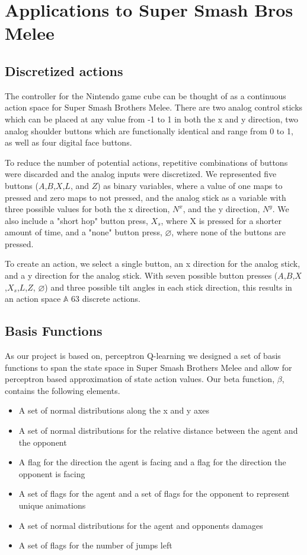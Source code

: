 \section{Applications to Super Smash Bros Melee}

\subsection{Discretized actions}
The controller for the Nintendo game cube can be thought of as a continuous action space for Super Smash Brothers Melee. There are two analog control sticks which can be placed at any value from -1 to 1 in both the x and y direction, two analog shoulder buttons which are functionally identical and range from 0 to 1, as well as four digital face buttons. 

To reduce the number of potential actions, repetitive combinations of buttons were discarded and the analog inputs were discretized. We represented five buttons ($A$,$B$,$X$,$L$, and $Z$) as binary variables, where a value of one maps to pressed and zero maps to not pressed, and the analog stick as a variable with three possible values for both the x direction, $N^{x}$, and the y direction, $N^{y}$. We also include a "short hop" button press, $X_{s}$, where X is pressed for a shorter amount of time, and a "none" button press, $\varnothing$, where none of the buttons are pressed. 

To create an action, we select a single button, an x direction for the analog stick, and a y direction for the analog stick. With seven possible button presses ($A$,$B$,$X$,$X_{s}$,$L$,$Z$, $\varnothing$) and three possible tilt angles in each stick direction, this results in an action space $\mathbb{A}$ 63 discrete actions.

\subsection{Basis Functions}
As our project is based on, perceptron Q-learning we designed a set of basis functions to span the state space in Super Smash Brothers Melee and allow for perceptron based approximation of state action values. Our beta function, $\beta$, contains the following elements.

\begin{itemize}
\item A set of normal distributions along the x and y axes
\item A set of normal distributions for the relative distance between the agent and the opponent
\item A flag for the direction the agent is facing and a flag for the direction the opponent is facing
\item A set of flags for the agent and a set of flags for the opponent to represent unique animations
\item A set of normal distributions for the agent and opponents damages
\item A set of flags for the number of jumps left
\end{itemize}

